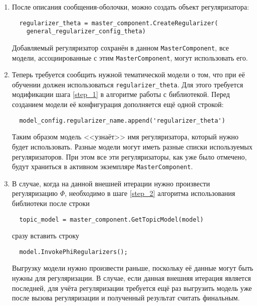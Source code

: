 \begin{enumerate}
	\item После описания сообщения-оболочки, можно создать объект регуляризатора:

	\vspace{4pt}	
	\verb|  regularizer_theta = master_component.CreateRegularizer(| \\
	\verb|    general_regularizer_config_theta)|
	\vspace{4pt}	
	
	Добавляемый регуляризатор сохранён в данном \verb|MasterComponent|, все модели, ассоциированные с этим \verb|MasterComponent|, могут использовать его.
	
	\item Теперь требуется сообщить нужной тематической модели о том, что при её обучении должен использоваться \verb|regularizer_theta|. Для этого требуется модификации шага \ref{step_1} в алгоритме работы с библиотекой. Перед созданием модели её конфигурация дополняется ещё одной строкой:
	
	\vspace{4pt}	
	\verb|  model_config.regularizer_name.append('regularizer_theta')|
	\vspace{4pt}	
		
	Таким образом модель <<узнаёт>> имя регуляризатора, который нужно будет использовать. Разные модели могут иметь разные списки используемых регуляризаторов. При этом все эти регуляризаторы, как уже было отмечено, будут храниться в активном экземпляре \verb|MasterComponent|.
	
	\item В случае, когда на данной внешней итерации нужно произвести регуляризацию $\Phi$, необходимо в шаге \ref{step_2} алгоритма использования библиотеки после строки
	
	\vspace{4pt}	
	\verb|  topic_model = master_component.GetTopicModel(model)|
	\vspace{4pt}	
	
	сразу вставить строку 
	
	\vspace{4pt}	
	\verb|  model.InvokePhiRegularizers();|
	\vspace{4pt}		
	
	Выгрузку модели нужно произвести раньше, поскольку её данные могут быть нужны для регуляризации. В случае, если данная внешняя итерация является последней, для учёта регуляризации требуется ещё раз выгрузить модель уже после вызова регуляризации и полученный результат считать финальным.
	

\end{enumerate}
